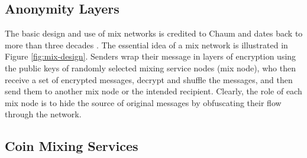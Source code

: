 \subsection{Anonymity Layers}


The basic design and use of mix networks is credited to Chaum and dates back to more than three decades \cite{Chaum81-Mix}. The essential idea of a mix network is illustrated in Figure \ref{fig:mix-design}. Senders wrap their message in layers of encryption using the public keys of randomly selected mixing service nodes (mix node), who then receive a set of encrypted messages, decrypt and shuffle the messages, and then send them to another mix node or the intended recipient. Clearly, the role of each mix node is to hide the source of original messages by obfuscating their flow through the network. 



\subsection{Coin Mixing Services}

